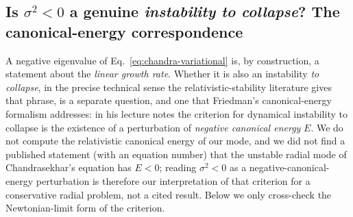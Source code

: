 \documentclass[11pt]{article}
\begin{document}
\subsection{Is \texorpdfstring{$\sigma^2<0$}{sigma-squared < 0} a genuine \emph{instability to collapse}? The canonical-energy correspondence}
\label{sec:friedman-correspondence}

A negative eigenvalue of Eq.~\eqref{eq:chandra-variational} is, by construction, a statement about the \emph{linear growth rate}. Whether it is also an instability \emph{to collapse}, in the precise technical sense the relativistic-stability literature gives that phrase, is a separate question, and one that Friedman's canonical-energy formalism addresses: in his lecture notes \citep{FriedmanLectures} the criterion for dynamical instability to collapse is the existence of a perturbation of \emph{negative canonical energy} $E$. We do not compute the relativistic canonical energy of our mode, and we did not find a published statement (with an equation number) that the unstable radial mode of Chandrasekhar's equation has $E<0$; reading $\sigma^2<0$ as a negative-canonical-energy perturbation is therefore our interpretation of that criterion for a conservative radial problem, not a cited result. Below we only cross-check the Newtonian-limit form of the criterion.
\end{document}
